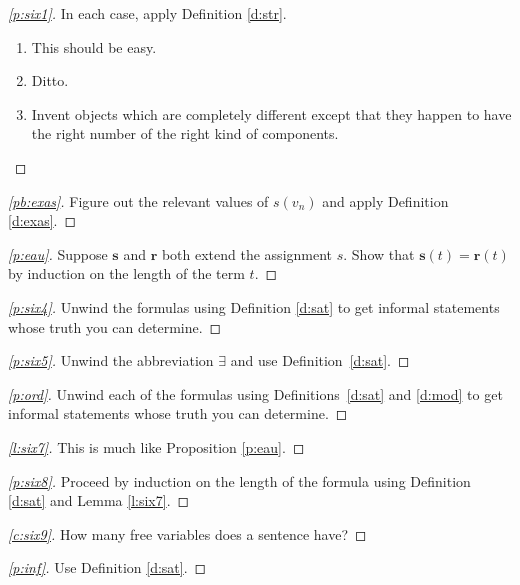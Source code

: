 \documentclass[12pt]{amsbook}
\theoremstyle{plain}
\theoremstyle{definition}
\theoremstyle{remark}
\newenvironment{clue}[1]%
{\begin{proof}[\ref{#1}]}%
{\renewcommand{\qed}{}\end{proof}}
\begin{document}
\begin{clue}{p:six1}
In each case,  apply Definition \ref{d:str}.
\begin{enumerate}
\item This should be easy.
\item Ditto.
\item Invent objects which are completely different except that they happen to have the right number of the right kind of components.
\end{enumerate}
\end{clue}

\begin{clue}{pb:exas}
Figure out the relevant values of $s(v_n)$ and apply Definition \ref{d:exas}.
\end{clue}

\begin{clue}{p:eau}
Suppose $\mathbf{s}$ and $\mathbf{r}$ both extend the assignment $s$.  Show that $\mathbf{s}(t) = \mathbf{r}(t)$ by induction on the length of the term $t$.
\end{clue}

\begin{clue}{p:six4}
Unwind the formulas using Definition \ref{d:sat} to get informal statements whose truth you can determine.
\end{clue}

\begin{clue}{p:six5}
Unwind the abbreviation $\exists$ and use Definition~\ref{d:sat}. 
\end{clue}

\begin{clue}{p:ord}
Unwind each of the formulas using Definitions~\ref{d:sat} and \ref{d:mod} to get informal statements whose truth you can determine.
\end{clue}

\begin{clue}{l:six7}
This is much like Proposition \ref{p:eau}.
\end{clue}

\begin{clue}{p:six8}
Proceed by induction on the length of the formula using Definition \ref{d:sat} and Lemma \ref{l:six7}.
\end{clue}

\begin{clue}{c:six9}
How many free variables does a sentence have?
\end{clue}

\begin{clue}{p:inf}
Use Definition \ref{d:sat}.
\end{clue}
\end{document}
